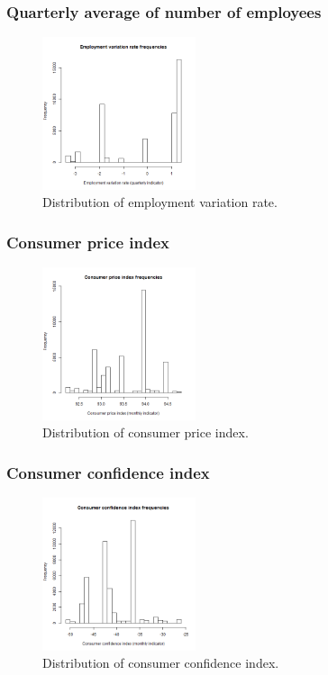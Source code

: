 \documentclass[11pt]{article}
\begin{document}
\begin{multicols}{2}
\subsubsection{Quarterly average of number of employees}
\begin{figure}[H]
	\centering
	\includegraphics[width=0.4\textwidth]{images/emp_var_rate}
	\caption{Distribution of employment variation rate.}
	\label{fig:emp_var_rate}
\end{figure}

\subsubsection{Consumer price index}
\begin{figure}[H]
	\centering
	\includegraphics[width=0.4\textwidth]{images/consumer_price_index}
	\caption{Distribution of consumer price index.}
	\label{fig:cons_price_idx}
\end{figure}

\subsubsection{Consumer confidence index}
\begin{figure}[H]
	\centering
	\includegraphics[width=0.4\textwidth]{images/consumer_confidence_index}
	\caption{Distribution of consumer confidence index.}
	\label{fig:cons_conf_idx}
\end{figure}


\end{multicols}
\end{document}
